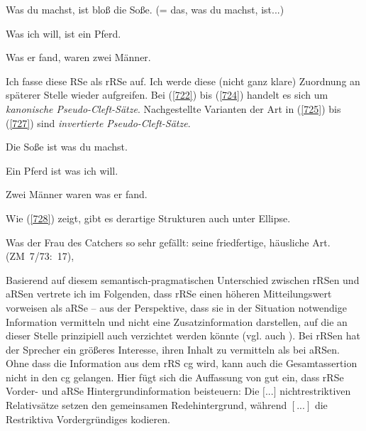 \begin{exe}
	\ex\label{722} 
	Was du machst, ist bloß die Soße. (= das, was du machst, ist...)
\end{exe}
\vspace{-0.65cm}
\begin{exe}
	\ex\label{723} 
	Was ich will, ist ein Pferd.
\end{exe}
\vspace{-0.65cm}
\begin{exe}
	\ex\label{724} 
	Was er fand, waren zwei Männer.
	\hfill\hbox {\citet[360]{Lehmann1984}}
\end{exe}
Ich fasse diese RSe als rRSe auf. Ich werde diese (nicht ganz klare) Zuordnung an späterer Stelle wieder aufgreifen. Bei (\ref{722}) bis (\ref{724}) handelt es sich um  \textit{kanonische Pseudo-Cleft-Sätze}. Nachgestellte Varianten der Art in (\ref{725}) bis (\ref{727}) sind  \textit{invertierte Pseudo-Cleft-Sätze}. 

\begin{exe}
	\ex\label{725} 
	Die Soße ist was du machst.
\end{exe}
\vspace{-0.65cm}
\begin{exe}
	\ex\label{726} 
	Ein Pferd ist was ich will.
\end{exe}
\vspace{-0.65cm}
\begin{exe}
	\ex\label{727} 
	Zwei Männer waren was er fand.
\end{exe}	
Wie (\ref{728}) zeigt, gibt es derartige Strukturen auch unter Ellipse.

\begin{exe}
	\ex\label{728} 
	Was der Frau des Catchers so sehr gefällt: seine friedfertige, häusliche Art. 
	\newline
	\hbox{}\hfill\hbox{(ZM 7/73: 17), \citet[74]{Dyhr1978}}	
\end{exe}
Basierend auf diesem semantisch-pragmatischen Unterschied zwischen rRSen und aRSen vertrete ich im Folgenden, dass rRSe einen höheren Mitteilungswert vorweisen als aRSe – aus der Perspektive, dass sie in der Situation notwendige Information vermitteln und nicht eine Zusatzinformation darstellen, auf die an dieser Stelle prinzipiell auch verzichtet werden könnte (vgl. auch \citealt[166-167]{Mueller2016a}). Bei rRSen hat der Sprecher ein größeres Interesse, ihren Inhalt zu vermitteln als bei aRSen. Ohne dass die Information aus dem rRS cg wird, kann auch die Gesamtassertion nicht in den cg gelangen. Hier fügt sich die Auffassung von \citet[86]{Abraham2012} gut ein, dass rRSe Vorder- und aRSe Hintergrundinformation beisteuern: \glqq Die $[$...$]$ nichtrestriktiven Relativsätze setzen den gemeinsamen Redehintergrund, während $[...]$ die Restriktiva Vordergründiges kodieren.\grqq{}  


